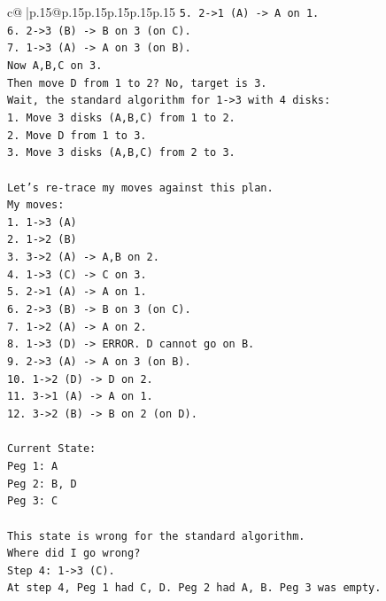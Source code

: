 \documentclass{article}
\begin{document}
{\begin{supertabular}{c@{$\;$}|p{.15\linewidth}@{}p{.15\linewidth}p{.15\linewidth}p{.15\linewidth}p{.15\linewidth}p{.15\linewidth}}
{{{\texttt{5. 2{-}>1 (A) {-}> A on 1.} \\
\texttt{6. 2{-}>3 (B) {-}> B on 3 (on C).} \\
\texttt{7. 1{-}>3 (A) {-}> A on 3 (on B).} \\
\texttt{Now A,B,C on 3.} \\
\texttt{Then move D from 1 to 2? No, target is 3.} \\
\texttt{Wait, the standard algorithm for 1{-}>3 with 4 disks:} \\
\texttt{1. Move 3 disks (A,B,C) from 1 to 2.} \\
\texttt{2. Move D from 1 to 3.} \\
\texttt{3. Move 3 disks (A,B,C) from 2 to 3.} \\
\\ 
\texttt{Let's re{-}trace my moves against this plan.} \\
\texttt{My moves:} \\
\texttt{1. 1{-}>3 (A)} \\
\texttt{2. 1{-}>2 (B)} \\
\texttt{3. 3{-}>2 (A) {-}> A,B on 2.} \\
\texttt{4. 1{-}>3 (C) {-}> C on 3.} \\
\texttt{5. 2{-}>1 (A) {-}> A on 1.} \\
\texttt{6. 2{-}>3 (B) {-}> B on 3 (on C).} \\
\texttt{7. 1{-}>2 (A) {-}> A on 2.} \\
\texttt{8. 1{-}>3 (D) {-}> ERROR. D cannot go on B.} \\
\texttt{9. 2{-}>3 (A) {-}> A on 3 (on B).} \\
\texttt{10. 1{-}>2 (D) {-}> D on 2.} \\
\texttt{11. 3{-}>1 (A) {-}> A on 1.} \\
\texttt{12. 3{-}>2 (B) {-}> B on 2 (on D).} \\
\\ 
\texttt{Current State:} \\
\texttt{Peg 1: A} \\
\texttt{Peg 2: B, D} \\
\texttt{Peg 3: C} \\
\\ 
\texttt{This state is wrong for the standard algorithm.} \\
\texttt{Where did I go wrong?} \\
\texttt{Step 4: 1{-}>3 (C).} \\
\texttt{At step 4, Peg 1 had C, D. Peg 2 had A, B. Peg 3 was empty.} \\
}}}
\end{supertabular}}
\end{document}
